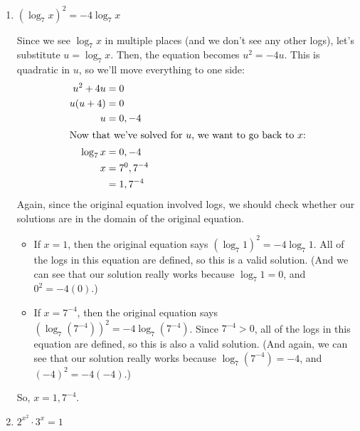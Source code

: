 \documentclass{article}
\theoremstyle{theorem}
\begin{document}
\begin{enumerate}[resume]
\begin{enumerate}
\begin{solution}
\begin{itemize}
      \end{itemize}
    \end{solution}

  \item 
    \begin{problem}
      $(\log_7 x)^2 = - 4 \log_7 x$
    \end{problem}

    \begin{solution}
      Since we see $\log_7 x$ in multiple places (and we don't see any other logs), let's substitute $u = \log_7 x$. Then, the equation becomes $u^2 = -4u$. This is quadratic in $u$, so we'll move everything to one side:
      \begin{align*}
        u^2 + 4u &= 0 \\
        u (u + 4) &= 0 \\
        u &= 0, -4 \\
        \intertext{Now that we've solved for $u$, we want to go back to $x$:}
        \log_7 x &= 0, -4 \\
        x &= 7^0, 7^{-4} \\
        &= 1, 7^{-4}
      \end{align*}
      Again, since the original equation involved logs, we should check whether our solutions are in the domain of the original equation.
      \begin{itemize}
      \item If $x = 1$, then the original equation says $(\log_7 1)^2 = -4 \log_7 1$. All of the logs in this equation are defined, so this is a valid solution. (And we can see that our solution really works because $\log_7 1 = 0$, and $0^2 = -4(0)$.)
      \item If $x = 7^{-4}$, then the original equation says $\left( \log_7 \left( 7^{-4} \right) \right)^2 = -4 \log_7 \left( 7^{-4} \right)$. Since $7^{-4} > 0$, all of the logs in this equation are defined, so this is also a valid solution. (And again, we can see that our solution really works because $\log_7 \left( 7^{-4} \right) = -4$, and $(-4)^2 = -4 (-4)$.)
      \end{itemize}
      So, $x = \boxed{1, 7^{-4}}$. 
    \end{solution}

  \item
    \begin{problem}
      $2^{x^2} \cdot 3^x = 1$
    \end{problem}


\end{enumerate}
\end{enumerate}
\end{document}
